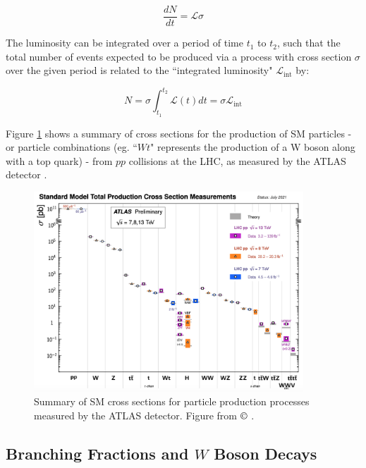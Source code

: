 \begin{equation}
\frac{dN}{dt} = \mathcal{L}\sigma
\end{equation}

The luminosity can be integrated over a period of time $t_1$ to $t_2$, such that the total number of events expected to be produced via a process with cross section $\sigma$ over the given period is related to the ``integrated luminosity" $\mathcal{L}_\text{int}$ by:

\begin{equation}
N = \sigma\int_{t_1}^{t_2}\mathcal{L}(t)dt = \sigma\mathcal{L}_\text{int}
\end{equation}

Figure \ref{fig:ATLAS_xsections} shows a summary of cross sections for the production of SM particles - or particle combinations (eg. ``$Wt$" represents the production of a W boson along with a top quark) - from $pp$ collisions at the LHC, as measured by the ATLAS detector \cite{atlas}. 

\begin{figure}[H]
	\centering
	\includegraphics[width=0.9\textwidth]{Figures/3/ATLAS_xsections.png}
	\caption[]{Summary of SM cross sections for particle production processes measured by the ATLAS detector. Figure from $\copyright$ \cite{ATL-PHYS-PUB-2021-032}.}
	\label{fig:ATLAS_xsections}
\end{figure}

\subsection{Branching Fractions and $W$ Boson Decays}

